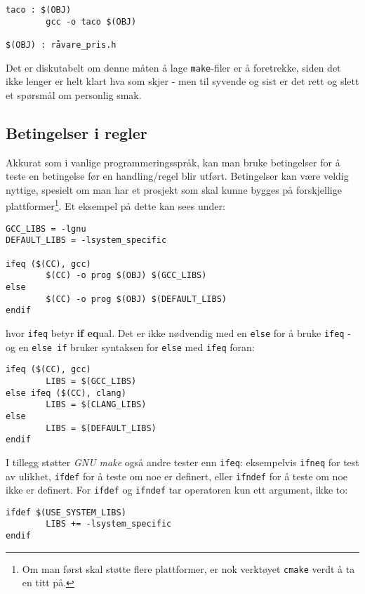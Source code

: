 \begin{alphasection}
\begin{lstlisting}
taco : $(OBJ)
        gcc -o taco $(OBJ)
        
$(OBJ) : råvare_pris.h
\end{lstlisting}


Det er diskutabelt om denne måten å lage \verb|make|-filer er å foretrekke, siden
det ikke lenger er helt klart hva som skjer - men til syvende og sist er det
rett og slett et spørsmål om personlig smak.

\subsection{Betingelser i regler}

Akkurat som i vanlige programmeringsspråk, kan man bruke betingelser for å teste en betingelse før en handling/regel blir utført. Betingelser kan være veldig nyttige, spesielt om man har et prosjekt som skal kunne bygges på forskjellige plattformer\footnote{Om man først skal støtte flere plattformer, er nok verktøyet \texttt{cmake} verdt å ta en titt på.}. Et eksempel på dette kan sees under: 

\begin{lstlisting}
GCC_LIBS = -lgnu
DEFAULT_LIBS = -lsystem_specific

ifeq ($(CC), gcc)
        $(CC) -o prog $(OBJ) $(GCC_LIBS)
else
        $(CC) -o prog $(OBJ) $(DEFAULT_LIBS)
endif
\end{lstlisting}

hvor \verb|ifeq| betyr \textbf{if eq}ual. Det er ikke nødvendig med en \verb|else| for å bruke \verb|ifeq| - og en \verb|else if| bruker syntaksen for \verb|else| med \verb|ifeq| foran: 

\begin{lstlisting}
ifeq ($(CC), gcc)
        LIBS = $(GCC_LIBS)
else ifeq ($(CC), clang)
        LIBS = $(CLANG_LIBS)
else
        LIBS = $(DEFAULT_LIBS)
endif
\end{lstlisting}

I tillegg støtter \textit{GNU make} også andre tester enn \verb|ifeq|: eksempelvis \verb|ifneq| for test av ulikhet, \verb|ifdef| for å teste om noe er definert, eller \verb|ifndef| for å teste om noe ikke er definert. For \verb|ifdef| og \verb|ifndef| tar operatoren kun ett argument, ikke to:

\begin{lstlisting}
ifdef $(USE_SYSTEM_LIBS)
        LIBS += -lsystem_specific
endif
\end{lstlisting}

\end{alphasection}              


\setcounter{section}{0}